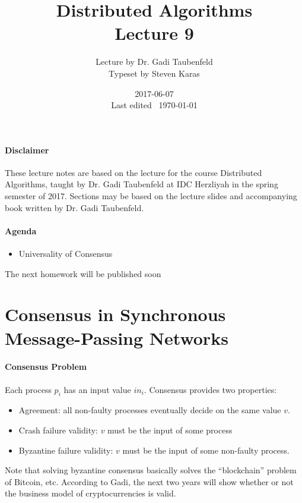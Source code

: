 \documentclass{idc_msc}
\title{Distributed Algorithms\\\large Lecture 9}
\date{2017-06-07 \\ Last edited \currenttime\ \today}
\author{Lecture by Dr. Gadi Taubenfeld\\Typeset by Steven Karas}
\begin{document}
\maketitle

\paragraph{Disclaimer}

These lecture notes are based on the lecture for the course Distributed Algorithms, taught by Dr. Gadi Taubenfeld at IDC Herzliyah in the spring semester of 2017.
Sections may be based on the lecture slides and accompanying book written by Dr. Gadi Taubenfeld.

\paragraph{Agenda}

\begin{itemize}
  \item Universality of Consensus
\end{itemize}

The next homework will be published soon

\section{Consensus in Synchronous Message-Passing Networks}

\paragraph{Consensus Problem}

Each process $p_i$ has an input value $in_i$.
Consensus provides two properties:

\begin{itemize}
  \item Agreement: all non-faulty processes eventually decide on the same value $v$.
  \item Crash failure validity: $v$ must be the input of some process
  \item Byzantine failure validity: $v$ must be the input of some non-faulty process.
\end{itemize}

Note that solving byzantine consensus basically solves the ``blockchain'' problem of Bitcoin, etc.
According to Gadi, the next two years will show whether or not the business model of cryptocurrencies is valid.
\end{document}
